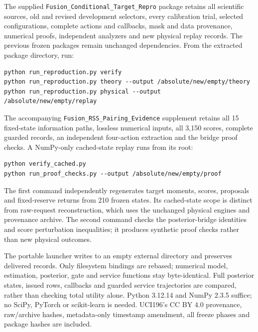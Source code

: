 \documentclass[10pt]{article}
\begin{document}
The supplied \texttt{Fusion\_Conditional\_Target\_Repro} package retains
all scientific sources, old and revised development selectors, every
calibration trial, selected configurations, complete actions and callbacks,
mask and data provenance, numerical proofs, independent analyzers and new
physical replay records. The previous frozen packages remain unchanged
dependencies. From the extracted package directory, run:
\begin{verbatim}
python run_reproduction.py verify
python run_reproduction.py theory --output /absolute/new/empty/theory
python run_reproduction.py physical --output /absolute/new/empty/replay
\end{verbatim}
The accompanying \texttt{Fusion\_RSS\_Pairing\_Evidence} supplement retains
all 15 fixed-state information paths, lossless numerical inputs, all 3,150
scores, complete guarded records, an independent four-action extraction and
the bridge proof checks. A NumPy-only cached-state replay runs from its root:
\begin{verbatim}
python verify_cached.py
python run_proof_checks.py --output /absolute/new/empty/proof
\end{verbatim}
The first command independently regenerates target moments, scores,
proposals and fixed-reserve returns from 210 frozen states. Its cached-state
scope is distinct from raw-request reconstruction, which uses the unchanged
physical engines and provenance archive. The second command checks the
posterior-bridge identities and score perturbation inequalities; it produces
synthetic proof checks rather than new physical outcomes.

The portable launcher writes to an empty external directory and preserves
delivered records. Only filesystem bindings are rebased; numerical model,
estimation, posterior, gate and service functions stay byte-identical.
Full posterior states, issued rows, callbacks and guarded service trajectories
are compared, rather than checking total utility alone. Python 3.12.14 and
NumPy 2.3.5 suffice; no SciPy, PyTorch or scikit-learn is needed. UCI196's
CC BY 4.0 provenance, raw/archive hashes, metadata-only timestamp amendment,
all freeze phases and package hashes are included.
\end{document}
